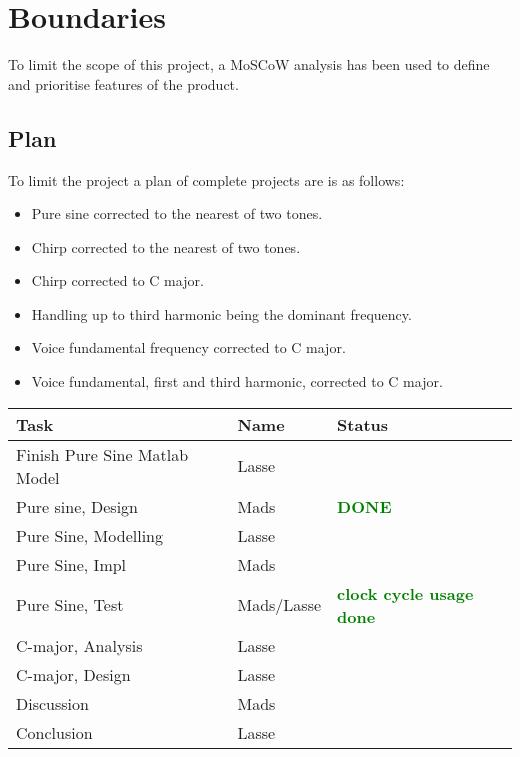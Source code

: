 
\chapter{Boundaries}
\label{sec:Boundaries}
To limit the scope of this project, a MoSCoW analysis has been used to define and prioritise features of the product.

\section{Plan}
To limit the project a plan of complete projects are is as follows:

\begin{itemize}
	\item Pure sine corrected to the nearest of two tones.
	\item Chirp corrected to the nearest of two tones.
	\item Chirp corrected to C major.
	\item Handling up to third harmonic being the dominant frequency.
	\item Voice fundamental frequency corrected to C major.
	\item Voice fundamental, first and third harmonic, corrected to C major.
\end{itemize}

\begin{table}
	\centering
	\begin{tabular}{l l l}
		\toprule
		Task & Name & Status \\
		\midrule
		Finish Pure Sine Matlab Model & Lasse & \\
		Pure sine, Design & Mads & \textcolor{green}{\textbf{DONE}}\\
		Pure Sine, Modelling & Lasse & \\
		Pure Sine, Impl & Mads & \\
		Pure Sine, Test & Mads/Lasse & \textcolor{green}{\textbf{clock cycle usage done}}\\
		C-major, Analysis & Lasse & \\
		C-major, Design & Lasse & \\
		Discussion & Mads & \\
		Conclusion & Lasse & \\
		\bottomrule
	\end{tabular}
\end{table}